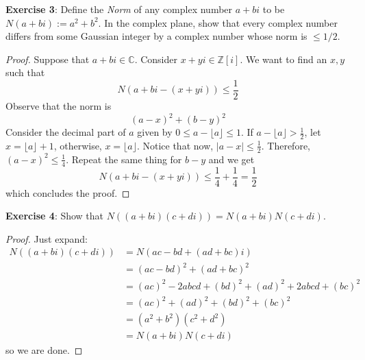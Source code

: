 \documentclass{article}
\begin{document}
\textbf{Exercise 3}: Define the \textit{Norm} of any complex number $a + bi$ to be $N(a + bi) := a^{2} + b^{2}$. In the complex plane, show that every complex number differs from some Gaussian integer by a complex number whose norm is $\leq 1 /2$.
    \begin{proof}
        Suppose that $a + bi \in \mathbb{C}$. Consider $x + yi \in \mathbb{Z}[i]$. We want to find an $x, y$ such that
            \begin{equation*}
                N(a + bi - (x + yi)) \leq \dfrac{1}{2}
            \end{equation*}
        Observe that the norm is 
            \begin{equation*}
                (a - x)^{2} + (b - y)^{2}
            \end{equation*}
        Consider the decimal part of $a$ given by $0 \leq a - \lfloor a \rfloor \leq 1$. If $a - \lfloor a \rfloor > \frac{1}{2}$, let $x = \lfloor a \rfloor + 1$, otherwise, $x = \lfloor a \rfloor$. Notice that now, $\lvert a - x \rvert \leq \frac{1}{2}$. Therefore, $(a - x)^{2} \leq \frac{1}{4}$. Repeat the same thing for $b - y$ and we get
            \begin{equation*}
                N(a + bi - (x + yi)) \leq \dfrac{1}{4} + \dfrac{1}{4} = \dfrac{1}{2}
            \end{equation*}
        which concludes the proof.
    \end{proof}

\textbf{Exercise 4}: Show that $N((a + bi)(c + di)) = N(a + bi)N(c + di)$.
    \begin{proof}
        Just expand:
            \begin{align*}
                N((a + bi)(c + di)) &= N(ac - bd + (ad + bc)i)                                   \\
                                    &= (ac - bd)^{2} + (ad + bc)^{2}                             \\
                                    &= (ac)^{2} - 2abcd + (bd)^{2} + (ad)^{2} + 2abcd + (bc)^{2} \\
                                    &= (ac)^{2} + (ad)^{2} + (bd)^{2} + (bc)^{2}                 \\
                                    &= (a^{2} + b^{2})(c^{2} + d^{2})                            \\
                                    &= N(a + bi)N(c + di)                                        
            \end{align*}
        so we are done.
    \end{proof}
\end{document}
